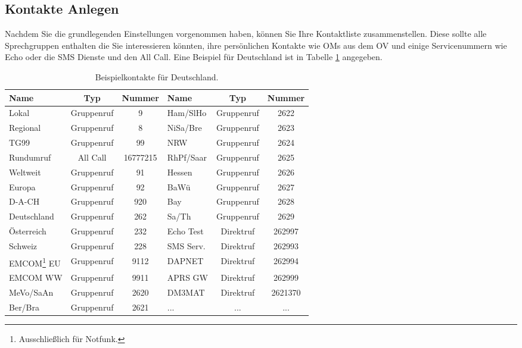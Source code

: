 \subsection{Kontakte Anlegen} \label{sec:cp:contact}
Nachdem Sie die grundlegenden Einstellungen vorgenommen haben, können Sie Ihre Kontaktliste zusammenstellen. Diese sollte alle Sprechgruppen enthalten die Sie interessieren könnten, ihre persönlichen Kontakte wie OMs aus dem OV und einige Servicenummern wie Echo oder die SMS Dienste und den All Call. Eine Beispiel für Deutschland ist in Tabelle \ref{tab:contacts} angegeben.

\begin{table}[!ht]
 \centering
 \begin{tabular}{|l|c|c||l|c|c|}\hline
  Name        & Typ        & Nummer & Name & Typ & Nummer \\ \hline
  Lokal       & Gruppenruf & 9        & Ham/SlHo    & Gruppenruf & 2622 \\
  Regional    & Gruppenruf & 8        & NiSa/Bre    & Gruppenruf & 2623 \\
  TG99        & Gruppenruf & 99       & NRW         & Gruppenruf & 2624 \\
  Rundumruf   & All Call   & 16777215 & RhPf/Saar   & Gruppenruf & 2625 \\
  Weltweit    & Gruppenruf & 91       & Hessen      & Gruppenruf & 2626 \\
  Europa      & Gruppenruf & 92       & BaWü        & Gruppenruf & 2627 \\
  D-A-CH      & Gruppenruf & 920      & Bay         & Gruppenruf & 2628 \\
  Deutschland & Gruppenruf & 262      & Sa/Th       & Gruppenruf & 2629 \\
  Österreich  & Gruppenruf & 232      & Echo Test   & Direktruf  & 262997 \\
  Schweiz     & Gruppenruf & 228      & SMS Serv.   & Direktruf  & 262993 \\
  EMCOM\footnote{Ausschließlich für Notfunk.} EU    & Gruppenruf & 9112 & 
  DAPNET      & Direktruf  & 262994 \\
  EMCOM WW    & Gruppenruf & 9911     & APRS GW     & Direktruf  & 262999 \\
  MeVo/SaAn   & Gruppenruf & 2620     & DM3MAT      & Direktruf  & 2621370 \\
  Ber/Bra     & Gruppenruf & 2621     & ...         & ...        & ... \\ \hline
 \end{tabular}
 \caption{Beispielkontakte für Deutschland.} \label{tab:contacts}
\end{table}


